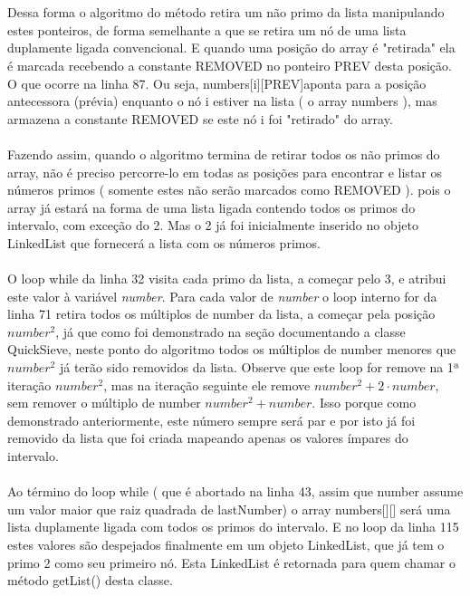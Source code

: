 \documentclass[a4paper,12pt,openany]{book}
\begin{document}
\\
\\
Dessa forma o algoritmo do método retira um não primo da lista manipulando estes ponteiros, de forma semelhante a que se retira um nó de uma lista duplamente ligada convencional. E quando uma posição do array é "retirada" ela é marcada recebendo a constante REMOVED no ponteiro PREV desta posição. O que ocorre na linha 87. Ou seja, numbers[i][PREV]aponta para a posição antecessora (prévia) enquanto o nó i estiver na lista ( o array numbers ), mas armazena a constante REMOVED se este nó i foi "retirado" do array.
\\
\\
Fazendo assim, quando o algoritmo termina de retirar todos os não primos do array, não é preciso percorre-lo em todas as posições para encontrar e listar os números primos ( somente estes não serão marcados como REMOVED ). pois o array já estará na forma de uma lista ligada contendo todos os primos do intervalo, com exceção do 2. Mas o 2 já foi inicialmente inserido no objeto LinkedList que fornecerá a lista com os números primos. 
\\
\\
O loop while da linha 32 visita cada primo da lista, a começar pelo 3, e atribui este valor à variável \textit{number}. Para cada valor de \textit{number} o loop interno for da linha 71 retira todos os múltiplos de number da lista, a começar pela posição $ number^2 $, já que como foi demonstrado na seção documentando a classe QuickSieve, neste ponto do algoritmo todos os múltiplos de number menores que $ number^2 $ já terão sido removidos da lista. Observe que este loop for remove na 1ª iteração $ number^2 $, mas na iteração seguinte ele remove $ number^2  + 2 \cdot number$, sem remover o múltiplo de number $ number^2 + number $. Isso porque 
como demonstrado anteriormente, este número sempre será par e por isto já foi removido da lista que foi criada mapeando apenas os valores ímpares do intervalo.
\\
\\
Ao término do loop while ( que é abortado na linha 43, assim que number assume um valor maior que raiz quadrada de lastNumber) o array numbers[][] será uma lista duplamente ligada com todos os primos do intervalo. E no loop da linha 115 estes valores são despejados finalmente em um objeto LinkedList, que já tem o primo 2 como seu primeiro nó. Esta LinkedList é retornada para quem chamar o método getList() desta classe.
\end{document}

